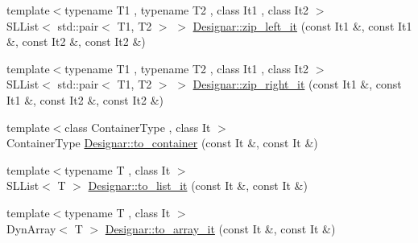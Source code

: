 \begin{DoxyCompactItemize}
\item 
{\footnotesize template$<$typename T1 , typename T2 , class It1 , class It2 $>$ }\\S\+L\+List$<$ std\+::pair$<$ T1, T2 $>$ $>$ \hyperlink{namespace_designar_aba3b0205f205231f2b7c8df5637b4752}{Designar\+::zip\+\_\+left\+\_\+it} (const It1 \&, const It1 \&, const It2 \&, const It2 \&)
\item 
{\footnotesize template$<$typename T1 , typename T2 , class It1 , class It2 $>$ }\\S\+L\+List$<$ std\+::pair$<$ T1, T2 $>$ $>$ \hyperlink{namespace_designar_a6461340f34943ba69a52a427a97e7140}{Designar\+::zip\+\_\+right\+\_\+it} (const It1 \&, const It1 \&, const It2 \&, const It2 \&)
\item 
{\footnotesize template$<$class Container\+Type , class It $>$ }\\Container\+Type \hyperlink{namespace_designar_a6a10446f00b4d600010819b75113190b}{Designar\+::to\+\_\+container} (const It \&, const It \&)
\item 
{\footnotesize template$<$typename T , class It $>$ }\\S\+L\+List$<$ T $>$ \hyperlink{namespace_designar_a500a98cf132b734b9058abdae7cd2e5d}{Designar\+::to\+\_\+list\+\_\+it} (const It \&, const It \&)
\item 
{\footnotesize template$<$typename T , class It $>$ }\\Dyn\+Array$<$ T $>$ \hyperlink{namespace_designar_a65634dc64216572c3a7bba9a2c47dbf4}{Designar\+::to\+\_\+array\+\_\+it} (const It \&, const It \&)
\end{DoxyCompactItemize}
